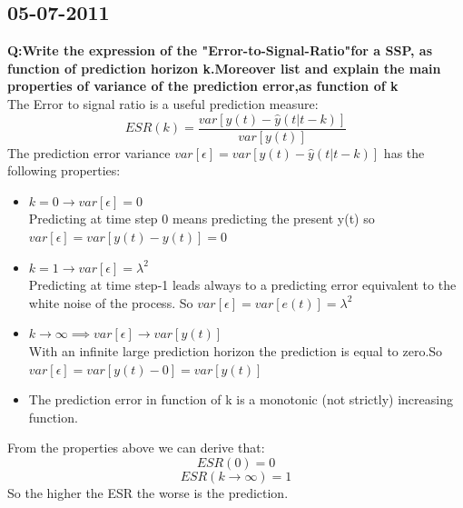 \documentclass[12pt]{article} %
\begin{document}
\subsection{05-07-2011}
\textbf{Q:Write the expression of the "Error-to-Signal-Ratio"for a SSP, as function of prediction horizon k.Moreover list and explain the main properties of variance of the prediction error,as function of k}\vspace{2mm}\\
The Error to signal ratio is a useful prediction measure:
$$ ESR(k) = \frac{var[y(t) - \hat{y}(t|t-k)]}{var[y(t)]}$$
The prediction error variance $var[\epsilon]=var[y(t) - \hat{y}(t|t-k)]$ has the following properties:
\begin{itemize}
\item $k=0 \to var[\epsilon] = 0$ \\
Predicting at time step 0 means predicting the present y(t) so $var[\epsilon]=var[y(t)-y(t)]=0$
\item $k=1 \to var[\epsilon] = \lambda^2 $\\
Predicting at time step-1 leads always to a predicting error equivalent to the white noise of the process. So $var[\epsilon]=var[e(t)]=\lambda^2$
\item $k \to \infty \implies var[\epsilon] \to var[y(t)]$\\
With an infinite large prediction horizon the prediction is equal to zero.So
$var[\epsilon]=var[y(t)-0]=var[y(t)]$
\item The prediction error in function of k is a monotonic (not strictly) increasing function.
\end{itemize}
From the properties above we can derive that:
$$ESR(0) = 0$$
$$ESR(k \to \infty) = 1$$
So the higher the ESR the worse is the prediction.
\newpage
\end{document}
